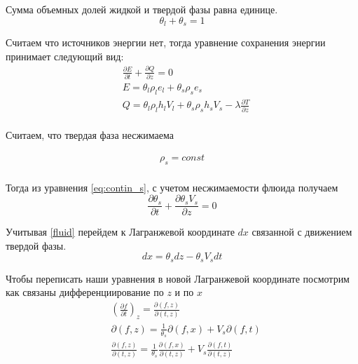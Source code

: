 \documentclass[12pt,a4paper]{article}
\newcommand{\pd}[2]{\frac{\partial #1}{\partial #2}}
\begin{document}
Сумма объемных долей жидкой и твердой фазы равна единице.
\begin{equation}
\theta_l + \theta_s = 1
\label{eq:satur}
\end{equation}

Считаем что источников энергии нет, тогда уравнение сохранения энергии принимает следующий вид:
\begin{equation}
\begin{aligned}
&\pd{E}{t} + \pd{Q}{z} =0 \\
&E=\theta_l\rho_l e_l + \theta_s\rho_s e_s \\
&Q=\theta_l\rho_l h_l V_l + \theta_s\rho_s h_s V_s - \lambda \pd{T}{z}\\
\label{eq:conserv}
\end{aligned}
\end{equation}

Считаем, что твердая фаза несжимаема

\begin{equation}
\begin{aligned}
\rho_s = const \\
\label{rho_const}
\end{aligned}
\end{equation}

Тогда из уравнения \eqref{eq:contin_s}, с учетом несжимаемости флюида получаем
\begin{equation}
\pd{\theta_s}{t} + \pd{\theta_s V_s}{z} = 0
\label{fluid}
\end{equation}

Учитывая \eqref{fluid} перейдем к Лагранжевой координате $dx$ связанной с движением твердой фазы.
\begin{equation}
dx = \theta_s dz - \theta_s V_s dt
\label{dx_dz}
\end{equation}

Чтобы переписать наши уравнения в новой Лагранжевой координате посмотрим как связаны дифференциирование по $ z $ и по $ x $
\begin{equation}
\begin{aligned}
&\left(\pd{f}{t}\right)_z = \pd{(f , z)}{(t , z)}\\
&\partial(f , z) = \frac{1}{\theta_s}\partial(f , x) + V_s \partial(f , t)\\
&\pd{(f , z)}{(t , z)} = \frac{1}{\theta_s}\pd{(f , x)}{(t , z)} + V_s\pd{(f , t)}{(t , z)}\\
\end{aligned}
\label{help1}
\end{equation}
\end{document}
